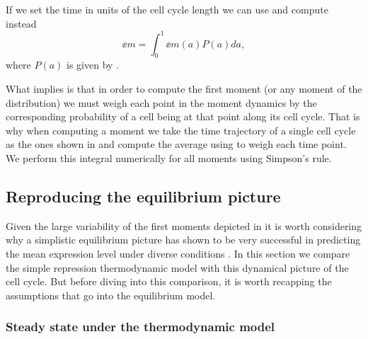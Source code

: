 If we set the time in units of the cell cycle length we can use
 and compute instead
\begin{equation}
  \ee{m} = \int_0^1 \ee{m(a)} P(a) da,
  \label{seq_moment_avg}
\end{equation}
where $P(a)$ is given by .

What  implies is that in order to compute the first moment
(or any moment of the distribution) we must weigh each point in the moment
dynamics by the corresponding probability of a cell being at that point along
its cell cycle. That is why when computing a moment we take the time trajectory
of a single cell cycle as the ones shown in  and
compute the average using  to weigh each time point. We
perform this integral numerically for all moments using Simpson's rule.

\subsection{Reproducing the equilibrium picture}

Given the large variability of the first moments depicted in
 it is worth considering why a simplistic
equilibrium picture has shown to be very successful in predicting the mean
expression level under diverse conditions \cite{Garcia2011c, Brewster2014,
Barnes2018, Razo-Mejia2018}. In this section we compare the simple repression
thermodynamic model with this dynamical picture of the cell cycle. But before
diving into this comparison, it is worth recapping the assumptions that go into
the equilibrium model.

\subsubsection{Steady state under the thermodynamic model}

